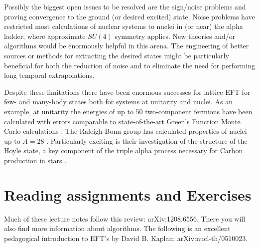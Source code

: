 Possibly the biggest open issues to be resolved are the sign/noise problems and proving convergence to the ground (or desired excited) state. Noise problems have restricted most calculations of nuclear systems to nuclei in (or near) the alpha ladder, where approximate $SU(4)$ symmetry applies. New theories and/or algorithms would be enormously helpful in this arena. The engineering of better sources or methods for extracting the desired states might be particularly beneficial for both the reduction of noise and to eliminate the need for performing long temporal extrapolations.

Despite these limitations there have been enormous successes for lattice EFT for few- and many-body states both for systems at unitarity and nuclei. As an example, at unitarity the energies of up to 50 two-component fermions have been calculated with errors comparable to state-of-the-art Green's Function Monte Carlo calculations \cite{EKLN1,EKLN2,EKLN3,EKLN4,LEKN1,NEKL1}. The Raleigh-Bonn group has calculated properties of nuclei up to $A=28$ \cite{Epelbaum:2010xt,Epelbaum:2009pd,Epelbaum:2013paa,Lahde:2013kma,Lahde:2013uqa}. Particularly exciting is their investigation of the structure of the Hoyle state, a key component of the triple alpha process necessary for Carbon production in stars \cite{Epelbaum:2011md,Epelbaum:2012qn,Epelbaum:2012iu,Epelbaum:2013wla,Lahde:2014bna}. 

\section{Reading assignments and Exercises}

\begin{prob}
Much of these lecture notes follow this review: arXiv:1208.6556. There you will also find more information about algorithms. The following is an excellent pedagogical introduction to EFT's by David B. Kaplan: arXiv:nucl-th/0510023.
\end{prob}

